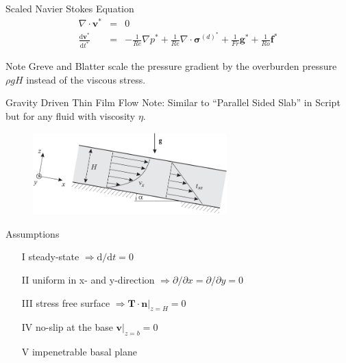 \documentclass[hide notes,intlimits,unknownkeysallowed]{beamer}
\newcommand{\bn}{\mathbf{n}}
\newcommand{\bv}{\mathbf{v}}
\newcommand{\epsdot}{\dot{\varepsilon}}
\begin{document}
\begin{frame}{Scaled Navier Stokes Equation}
  \begin{eqnarray}
    \nabla \cdot \bm{v}^* & = & 0 \\
    \frac{\textrm{d} {\bm{v}^*}}{\textrm{d} t^*} & = & -\frac{1}{Re}\nabla p^* +  \frac{1}{Re}\nabla \cdot \bm{\sigma}^{(d)^*}  + \frac{1}{Fr}\bm{g}^* + \frac{1}{Ro}\bm{f}^*
  \end{eqnarray}
  \begin{block}{Note}
    Greve and Blatter scale the pressure gradient by the overburden pressure $\rho g H$ instead of the viscous stress.
  \end{block}
\end{frame}

\begin{frame}{Gravity Driven Thin Film Flow}
  \alert{Note}: Similar to ``Parallel Sided Slab'' in Script but for any fluid with viscosity $\eta$.
  \begin{figure}
    \includegraphics[width=7.5cm]{fig_3_11}
  \end{figure}
  \vspace{-1em}
  \begin{block}{Assumptions}
    \begin{itemize}
    \item[I] steady-state $\Rightarrow \mathrm{d} / \mathrm{d} t = 0$
    \item[II] uniform in x- and y-direction $\Rightarrow \partial / \partial x = \partial / \partial y = 0$
    \item[III] stress free surface $\Rightarrow \mathbf{T}\cdot \bn \vert_{z=H} = 0$
    \item[IV] no-slip at the base $\bv \vert_{z=b} = 0$
    \item[V] impenetrable basal plane 
    \end{itemize}
  \end{block}
\end{frame}
\end{document}
